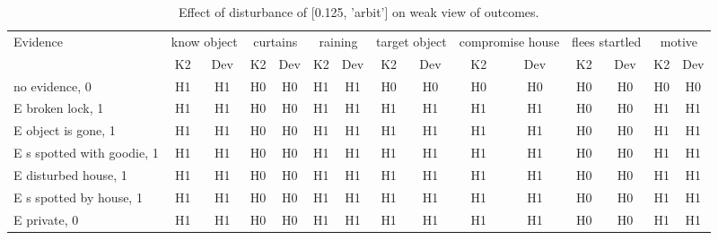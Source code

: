 \begin{table}\begin{tabular}{l|cc|cc|cc|cc|cc|cc|cc}\toprule\multirow{2}{*}{Evidence} & \multicolumn{2}{c}{know object}& \multicolumn{2}{c}{curtains}& \multicolumn{2}{c}{raining}& \multicolumn{2}{c}{target object}& \multicolumn{2}{c}{compromise house}& \multicolumn{2}{c}{flees startled}& \multicolumn{2}{c}{motive}\\& {K2} & {Dev}& {K2} & {Dev}& {K2} & {Dev}& {K2} & {Dev}& {K2} & {Dev}& {K2} & {Dev}& {K2} & {Dev}\\\midrule
no evidence, 0 & H1&H1&H0&H0&H1&H1&H0&H0&H0&H0&H0&H0&H0&H0\\E broken lock, 1 & H1&H1&H0&H0&H1&H1&H1&H1&H1&H1&H0&H0&H1&H1\\E object is gone, 1 & H1&H1&H0&H0&H1&H1&H1&H1&H1&H1&H0&H0&H1&H1\\E s spotted with goodie, 1 & H1&H1&H0&H0&H1&H1&H1&H1&H1&H1&H0&H0&H1&H1\\E disturbed house, 1 & H1&H1&H0&H0&H1&H1&H1&H1&H1&H1&H0&H0&H1&H1\\E s spotted by house, 1 & H1&H1&H0&H0&H1&H1&H1&H1&H1&H1&H0&H0&H1&H1\\E private, 0 & H1&H1&H0&H0&H1&H1&H1&H1&H1&H1&H0&H0&H1&H1\\\bottomrule\end{tabular}\caption{Effect of disturbance of [0.125, 'arbit'] on weak view of outcomes.}\end{table}